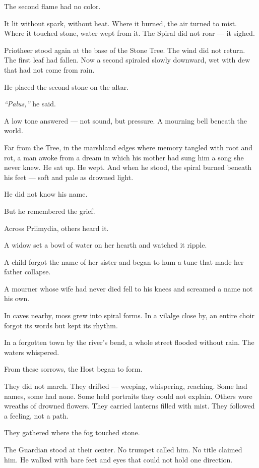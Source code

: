 \documentclass[12pt]{article}
\begin{document}
The second flame had no color.

It lit without spark, without heat. Where it burned, the air turned to mist. Where it touched stone, water wept from it. The Spiral did not roar — it sighed.

Priotheer stood again at the base of the Stone Tree. The wind did not return. The first leaf had fallen. Now a second spiraled slowly downward, wet with dew that had not come from rain.

He placed the second stone on the altar.

\textit{``Palus,''} he said.

A low tone answered — not sound, but pressure. A mourning bell beneath the world.

Far from the Tree, in the marshland edges where memory tangled with root and rot, a man awoke from a dream in which his mother had sung him a song she never knew. He sat up. He wept. And when he stood, the spiral burned beneath his feet — soft and pale as drowned light.

He did not know his name.

But he remembered the grief.

Across Priimydia, others heard it.

A widow set a bowl of water on her hearth and watched it ripple.

A child forgot the name of her sister and began to hum a tune that made her father collapse.

A mourner whose wife had never died fell to his knees and screamed a name not his own.

In caves nearby, moss grew into spiral forms. In a vilalge close by, an entire choir forgot its words but kept its rhythm.

In a forgotten town by the river’s bend, a whole street flooded without rain. The waters whispered.

From these sorrows, the Host began to form.

They did not march. They drifted — weeping, whispering, reaching. Some had names, some had none. Some held portraits they could not explain. Others wore wreaths of drowned flowers. They carried lanterns filled with mist. They followed a feeling, not a path.

They gathered where the fog touched stone.

The Guardian stood at their center. No trumpet called him. No title claimed him. He walked with bare feet and eyes that could not hold one direction.
\end{document}
